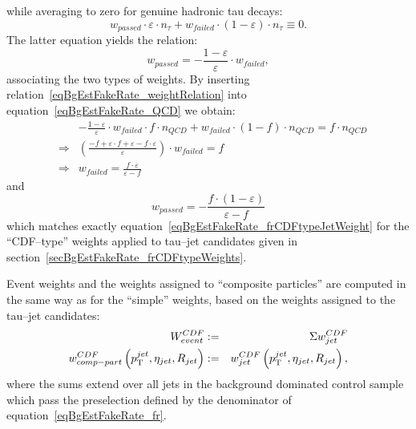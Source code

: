 while averaging to zero for genuine hadronic tau decays:
\begin{equation*}
w_{passed} \cdot \varepsilon \cdot n_{\tau} + w_{failed} \cdot \left( 1 - \varepsilon \right) \cdot n_{\tau} \equiv 0.
\label{eqBgEstFakeRate_tau}
\end{equation*}
The latter equation yields the relation:
\begin{equation}
w_{passed} = -\frac{1 - \varepsilon}{\varepsilon} \cdot w_{failed},
\label{eqBgEstFakeRate_weightRelation}
\end{equation}
associating the two types of weights.  By inserting
relation~\ref{eqBgEstFakeRate_weightRelation} into
equation~\ref{eqBgEstFakeRate_QCD} we obtain:
\begin{eqnarray*}
& & -\frac{1 - \varepsilon}{\varepsilon} \cdot w_{failed} \cdot f \cdot n_{QCD} + w_{failed} \cdot \left( 1 - f \right) \cdot n_{QCD} 
 = f \cdot n_{QCD} \\
& \Rightarrow & \left( \frac{-f + \varepsilon \cdot f + \varepsilon - f \cdot \varepsilon}{\varepsilon} \right) \cdot w_{failed} = f \\
& \Rightarrow & w_{failed} = \frac{f \cdot \varepsilon}{\varepsilon - f} 
\end{eqnarray*}
and 
\begin{equation}
w_{passed} = -\frac{f \cdot \left( 1 - \varepsilon \right)}{\varepsilon - f}
\end{equation}
which matches exactly equation~\ref{eqBgEstFakeRate_frCDFtypeJetWeight} 
for the ``CDF--type'' weights applied to tau--jet candidates given in section~\ref{secBgEstFakeRate_frCDFtypeWeights}.

Event weights and the weights assigned to ``composite particles'' 
are computed in the same way as for the ``simple'' weights,
based on the weights assigned to the tau--jet candidates:
\begin{eqnarray}
W_{event}^{CDF} & := & \Sigma w_{jet}^{CDF} \nonumber \\
w_{comp-part}^{CDF} \left( p_{\mathrm{T}}^{jet}, \eta_{jet}, R_{jet} \right) & := & 
  w_{jet}^{CDF} \left( p_{\mathrm{T}}^{jet}, \eta_{jet}, R_{jet} \right),
\label{eqBgEstFakeRate_frCDFtypeEvent_and_CompositeParticleWeight}
\end{eqnarray}
where the sums extend over all jets in the background dominated control sample
which pass the preselection defined by the denominator of
equation~\ref{eqBgEstFakeRate_fr}.

